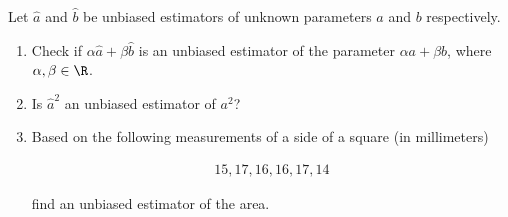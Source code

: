 
\begin{exercise}

Let $\hat{a}$ and $\hat{b}$ be unbiased estimators of unknown parameters $a$ and $b$
respectively.

\begin{enumerate}[label = (\alph*)]
  \item Check if $\alpha \hat{a} + \beta \hat{b}$ is an unbiased estimator of the
  parameter $\alpha a + \beta b$, where $\alpha, \beta \in \R$.
  \item Is $\hat{a}^2$ an unbiased estimator of $a^2$?
  \item Based on the following measurements of a side of a square (in millimeters)

  \begin{align*}
    15,17,16,16,17,14
  \end{align*}

  find an unbiased estimator of the area.
\end{enumerate}

\end{exercise}


